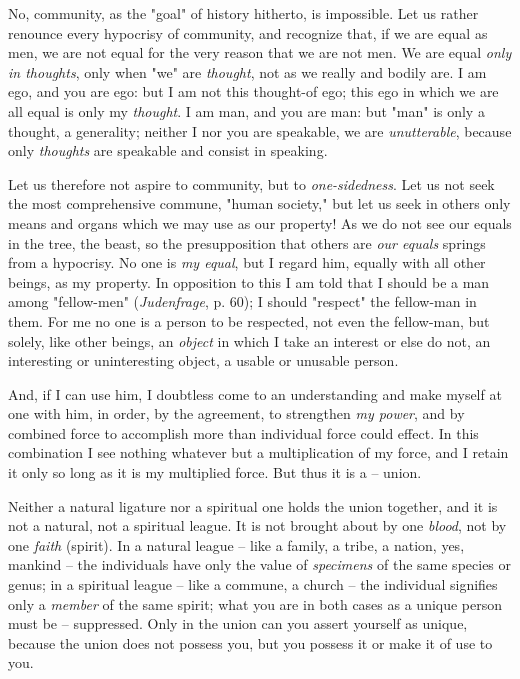 \documentclass[a4paper]{book}
\begin{document}
No, community, as the "{}goal"{} of history hitherto, is impossible. Let us 
rather renounce every hypocrisy of community, and recognize that, if we are 
equal as men, we are not equal for the very reason that we are not men. We are 
equal \textit{only in thoughts}, only when "{}we"{} are \textit{thought}, not 
as we really and bodily are. I am ego, and you are ego: but I am not this 
thought-of ego; this ego in which we are all equal is only my 
\textit{thought}. I am man, and you are man: but "{}man"{} is only a thought, 
a generality; neither I nor you are speakable, we are \textit{unutterable}, 
because only \textit{thoughts} are speakable and consist in speaking.

Let us therefore not aspire to community, but to \textit{one-sidedness}. Let 
us not seek the most comprehensive commune, "{}human society,"{} but let us 
seek in others only means and organs which we may use as our property! As we 
do not see our equals in the tree, the beast, so the presupposition that 
others are \textit{our equals} springs from a hypocrisy. No one is \textit{my 
equal}, but I regard him, equally with all other beings, as my property. In 
opposition to this I am told that I should be a man among "{}fellow-men"{} 
(\textit{Judenfrage}, p. 60); I should "{}respect"{} the fellow-man in them. 
For me no one is a person to be respected, not even the fellow-man, but 
solely, like other beings, an \textit{object} in which I take an interest or 
else do not, an interesting or uninteresting object, a usable or unusable 
person.

And, if I can use him, I doubtless come to an understanding and make myself at 
one with him, in order, by the agreement, to strengthen \textit{my power}, and 
by combined force to accomplish more than individual force could effect. In 
this combination I see nothing whatever but a multiplication of my force, and 
I retain it only so long as it is my multiplied force. But thus it is a -- 
union.

Neither a natural ligature nor a spiritual one holds the union together, and 
it is not a natural, not a spiritual league. It is not brought about by one 
\textit{blood}, not by one \textit{faith} (spirit). In a natural league -- 
like a family, a tribe, a nation, yes, mankind -- the individuals have only 
the value of \textit{specimens} of the same species or genus; in a spiritual 
league -- like a commune, a church -- the individual signifies only a 
\textit{member} of the same spirit; what you are in both cases as a unique 
person must be -- suppressed. Only in the union can you assert yourself as 
unique, because the union does not possess you, but you possess it or make it 
of use to you.
\end{document}
